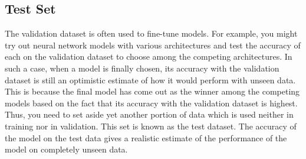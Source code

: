 \subsection*{Test Set}
The validation dataset is often used to fine-tune models. For example, you might try out neural network models with various architectures and test the accuracy of each on the validation dataset to choose among the competing architectures. In such a case, when a model is finally chosen, its accuracy with the validation dataset is still an optimistic estimate of how it would perform with unseen data. This is because the final model has come out as the winner among the competing models based on the fact that its accuracy with the validation dataset is highest. Thus, you need to set aside yet another portion of data which is used neither in training nor in validation. This set is known as the test dataset. The accuracy of the model on the test data gives a realistic estimate of the performance of the model on completely unseen data.



